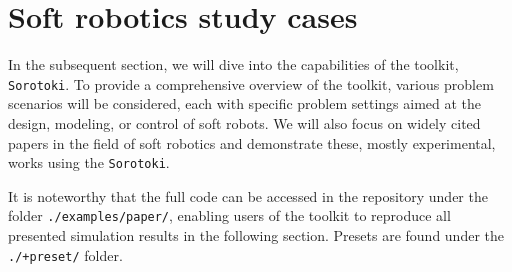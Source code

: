 \section{Soft robotics study cases}
\label{sec:C5:studycases}
In the subsequent section, we will dive into the capabilities of the toolkit, \texttt{Sorotoki}. To provide a comprehensive overview of the toolkit, various problem scenarios will be considered, each with specific problem settings aimed at the design, modeling, or control of soft robots. We will also focus on widely cited papers in the field of soft robotics and demonstrate these, mostly experimental, works using the \texttt{Sorotoki}.
\begin{rmk}
It is noteworthy that the full code can be accessed in the repository under the folder \texttt{./examples/paper/}, enabling users of the toolkit to reproduce all presented simulation results in the following section. Presets are found under the \texttt{./+preset/} folder.
\end{rmk}
%
